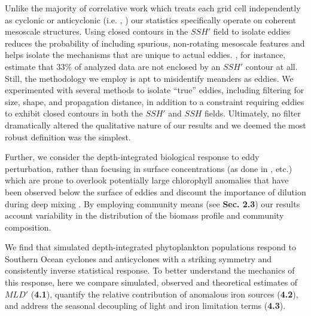 Unlike the majority of correlative work which treats each grid cell independently as cyclonic or anticyclonic (i.e. \textcite{GaubeRegionalvariationsinfluence2014}, \textcite{SongSeasonalvariationcorrelation2018}) our statistics specifically operate on coherent mesoscale structures. Using closed contours in the $SSH'$ field to isolate eddies reduces the probability of including spurious, non-rotating mesoscale features and helps isolate the mechanisms that are unique to actual eddies. \textcite{SongSeasonalvariationcorrelation2018}, for instance, estimate that 33\% of analyzed data are not enclosed by an $SSH'$ contour at all. Still, the \textcite{Faghmousdailyglobalmesoscale2015} methodology we employ is apt to misidentify meanders as eddies. We experimented with several methods to isolate ``true'' eddies, including filtering for size, shape, and propagation distance, in addition to a constraint requiring eddies to exhibit closed contours in both the $SSH'$ and $SSH$ fields. Ultimately, no filter dramatically altered the qualitative nature of our results and we deemed the most robust definition was the simplest. 
    
Further, we consider the depth-integrated biological response to eddy perturbation, rather than focusing in surface concentrations (as done in \textcite{Misumiironbudgetocean2014,GaubeRegionalvariationsinfluence2014,FrengerImprintSouthernOcean2018}, etc.) which are prone to overlook potentially large chlorophyll anomalies that have been observed below the surface of eddies \parencite{SiegelMesoscaleeddiessatellite1999,McGillicuddyEddywindinteractions2007} and discount the importance of dilution during deep mixing \parencite{BehrenfeldAnnualcyclesecological2013}. By employing community means (see \textbf{Sec. 2.3}) our results account variability in the distribution of the biomass profile and community composition. 

We find that simulated depth-integrated phytoplankton populations respond to Southern Ocean cyclones and anticyclones with a striking symmetry and consistently inverse statistical response. To better understand the mechanics of this response, here we compare simulated, observed and theoretical estimates of $MLD'$ (\textbf{4.1}), quantify the relative contribution of anomalous iron sources (\textbf{4.2}), and address the seasonal decoupling of light and iron limitation terms (\textbf{4.3}).

    
